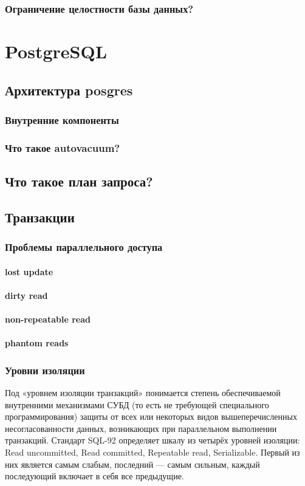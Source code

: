 \subsection{Ограничение целостности базы данных?}


\chapter{PostgreSQL}

\section{Архитектура posgres}
\subsection{Внутренние компоненты}
\subsection{Что такое autovacuum?}
\section{Что такое план запроса?}

\section{Транзакции}

\subsection{Проблемы параллельного доступа}
\subsubsection{lost update}
\subsubsection{dirty read}
\subsubsection{non-repeatable read}
\subsubsection{phantom reads}

\subsection{Уровни изоляции}
Под «уровнем изоляции транзакций» понимается степень обеспечиваемой внутренними механизмами СУБД (то есть не требующей специального программирования) защиты от всех или некоторых видов вышеперечисленных несогласованности данных, возникающих при параллельном выполнении транзакций. Стандарт SQL-92 определяет шкалу из четырёх уровней изоляции: Read uncommitted, Read committed, Repeatable read, Serializable. Первый из них является самым слабым, последний — самым сильным, каждый последующий включает в себя все предыдущие. 

